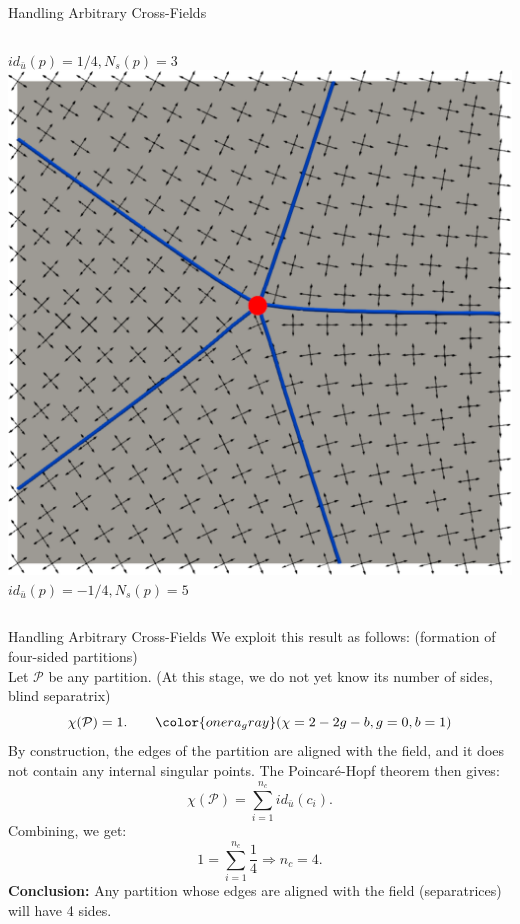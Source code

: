 \documentclass[compress,10pt,aspectratio=169]{beamer}
\begin{document}
\begin{frame}{Handling Arbitrary Cross-Fields}
\begin{columns}
\begin{column}{0.3\textwidth}
  \scriptsize $id_{\bar{u}}(p)=1/4, N_s(p) = 3$
  \\\vspace{0.1cm}
  \includegraphics[scale=0.1]{images/sepa_5.pdf}
  \scriptsize $id_{\bar{u}}(p)=-1/4, N_s(p) = 5$
  \\\vspace{0.3cm}
    \end{column}
\end{columns}

\end{frame}


\begin{frame}{Handling Arbitrary Cross-Fields}%
\small
\vspace{-0.2cm}
We exploit this result as follows: {\color{onera_gray} (formation of four-sided partitions)}\\\vspace{0.1cm}
Let $\mathcal{P}$ be any partition. {\color{onera_gray} (At this stage, we do not yet know its number of sides, blind separatrix)}
$$\chi(\mathcal{P})=1. \quad\quad{\color{onera_gray} (\chi=2-2g-b, g=0, b=1)}$$
By construction, the edges of the partition are aligned with the field, and it does not contain any internal singular points. The Poincaré-Hopf theorem then gives:
$$\chi(\mathcal{P})=\sum_{i=1}^{n_c}id_{\bar{u}}(c_i).$$
Combining, we get:
$$1=\sum_{i=1}^{n_c}\frac{1}{4}\Longrightarrow n_c=4.$$
\textbf{Conclusion:} Any partition whose edges are aligned with the field (separatrices) will have 4 sides.
\vspace{0.4cm}
\end{frame}
\end{document}
